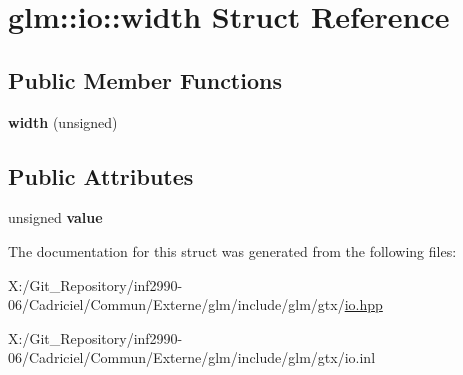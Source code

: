 \hypertarget{structglm_1_1io_1_1width}{\section{glm\-:\-:io\-:\-:width Struct Reference}
\label{structglm_1_1io_1_1width}
}
\subsection*{Public Member Functions}
\begin{DoxyCompactItemize}
\item 
\hypertarget{structglm_1_1io_1_1width_a1576674b7e08dc5014ce4f41ac6eea5b}{{\bfseries width} (unsigned)}\label{structglm_1_1io_1_1width_a1576674b7e08dc5014ce4f41ac6eea5b}

\end{DoxyCompactItemize}
\subsection*{Public Attributes}
\begin{DoxyCompactItemize}
\item 
\hypertarget{structglm_1_1io_1_1width_a6bf1338eb947811d36ec93bd2e9b8425}{unsigned {\bfseries value}}\label{structglm_1_1io_1_1width_a6bf1338eb947811d36ec93bd2e9b8425}

\end{DoxyCompactItemize}


The documentation for this struct was generated from the following files\-:\begin{DoxyCompactItemize}
\item 
X\-:/\-Git\-\_\-\-Repository/inf2990-\/06/\-Cadriciel/\-Commun/\-Externe/glm/include/glm/gtx/\hyperlink{io_8hpp}{io.\-hpp}\item 
X\-:/\-Git\-\_\-\-Repository/inf2990-\/06/\-Cadriciel/\-Commun/\-Externe/glm/include/glm/gtx/io.\-inl\end{DoxyCompactItemize}
